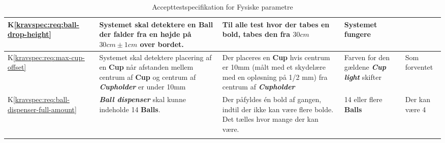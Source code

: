 \documentclass[Accepttestspecifikation/Accepttest_Main.tex]{subfiles}
\begin{document}
\begin{longtable}{|L{0.08\textwidth}|L{0.3\textwidth}|L{0.3\textwidth}|L{0.2\textwidth}|L{0.2\textwidth}|}
K\ref{kravspec:req:ball-drop-height} & Systemet skal detektere en \textbf{Ball} der falder fra en højde på $30\si{cm} \pm 1\si{cm}$ over bordet. & Til alle test hvor der tabes en bold, tabes den fra $30\si{cm}$ & Systemet fungere & \\ \hline 
K\ref{kravspec:req:max-cup-offset} & Systemet skal detektere placering af en \textbf{Cup} når afstanden mellem centrum af \textbf{Cup} og centrum af \textit{\textbf{Cupholder}} er under 10mm & Der placeres en \textbf{Cup} hvis centrum er 10mm (målt med et skydelære med en opløsning på 1/2 mm) fra centrum af \textit{\textbf{Cupholder}}& Farven for den gældene \textbf{\textit{Cup light}} skifter & Som forventet\\ \hline
K\ref{kravspec:req:ball-dispenser-full-amount} & \textit{\textbf{Ball dispenser}} skal kunne indeholde 14 \textbf{Balls}. & Der påfyldes én bold af gangen, indtil der ikke kan være flere bolde. Det tælles hvor mange der kan være. & 14 eller flere \textbf{Balls} & Der kan være 4\\ \hline
\caption{Accepttestspecifikation for Fysiske parametre}
\label{tab:IkkeFunktFysiske}
\end{longtable}
\end{document}
